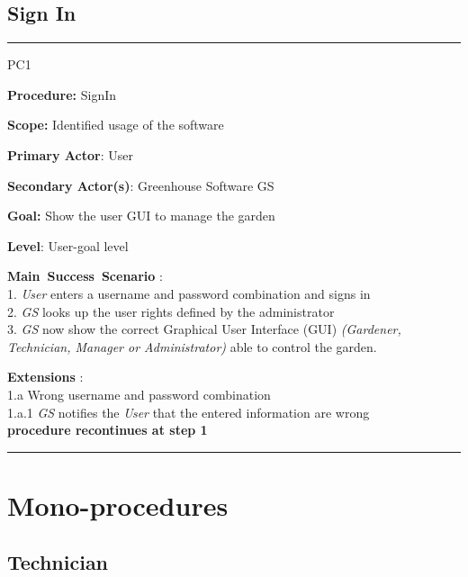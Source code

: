 \break


\subsection{Sign In}
\vspace{0.5cm}
\hrule
\hfill \break
\begin{lyxlist}{PC1}
\small{
\item [\textbf{Procedure:}] SignIn
\item [\textbf{Scope:}] Identified usage of the software
\item [\textbf{Primary Actor}:] User
\item [\textbf{Secondary Actor(s)}:] Greenhouse Software GS
\item [\textbf{Goal:}] Show the user GUI to manage the garden
\item [\textbf{Level}:] User-goal level
\item [\textbf{Main~Success~Scenario}]:\\
1. \emph{User} enters a username and password combination and signs in\\
2. \emph{GS} looks up the user rights defined by the administrator\\
3. \emph{GS} now show the correct Graphical User Interface (GUI) \emph{(Gardener, Technician, Manager or Administrator)} able to control the garden.
\item [\textbf{Extensions}]:\\
1.a Wrong username and password combination\\
\hspace*{0.5cm} 1.a.1 \emph{GS} notifies the \emph{User} that the entered information are wrong\\
\hspace*{0.5cm} \textbf{procedure recontinues at step 1}
}
\end{lyxlist}
\hrule
\vspace{0.5cm}


\break



\section{Mono-procedures}



\subsection{Technician}







